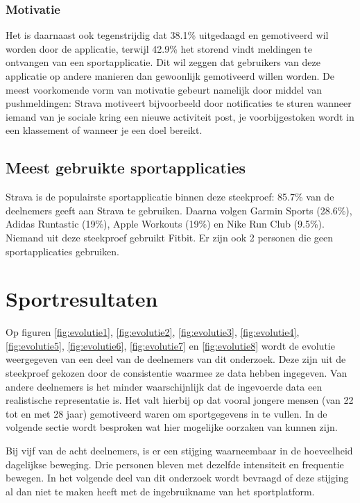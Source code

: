 \subsubsection{Motivatie}

Het is daarnaast ook tegenstrijdig dat 38.1\% uitgedaagd en gemotiveerd wil worden door de applicatie, terwijl 42.9\% het storend vindt meldingen te ontvangen van een sportapplicatie. Dit wil zeggen dat gebruikers van deze applicatie op andere manieren dan gewoonlijk gemotiveerd willen worden.
De meest voorkomende vorm van motivatie gebeurt namelijk door middel van pushmeldingen:
Strava motiveert bijvoorbeeld door notificaties te sturen wanneer iemand van je sociale kring een nieuwe activiteit post, je voorbijgestoken wordt in een klassement of wanneer je een doel bereikt.

\subsection{Meest gebruikte sportapplicaties}

Strava is de populairste sportapplicatie binnen deze steekproef: 85.7\% van de deelnemers geeft aan Strava te gebruiken. Daarna volgen Garmin Sports (28.6\%), Adidas Runtastic (19\%), Apple Workouts (19\%) en Nike Run Club (9.5\%). Niemand uit deze steekproef gebruikt Fitbit. Er zijn ook 2 personen die geen sportapplicaties gebruiken.

\section{Sportresultaten}

Op figuren \ref{fig:evolutie1}, \ref{fig:evolutie2}, \ref{fig:evolutie3}, \ref{fig:evolutie4}, \ref{fig:evolutie5}, \ref{fig:evolutie6}, \ref{fig:evolutie7} en \ref{fig:evolutie8} wordt de evolutie weergegeven van een deel van de deelnemers van dit onderzoek. Deze zijn uit de steekproef gekozen door de consistentie waarmee ze data hebben ingegeven. Van andere deelnemers is het minder waarschijnlijk dat de ingevoerde data een realistische representatie is. Het valt hierbij op dat vooral jongere mensen (van 22 tot en met 28 jaar) gemotiveerd waren om sportgegevens in te vullen. In de volgende sectie wordt besproken wat hier mogelijke oorzaken van kunnen zijn.

Bij vijf van de acht deelnemers, is er een stijging waarneembaar in de hoeveelheid dagelijkse beweging. Drie personen bleven met dezelfde intensiteit en frequentie bewegen. In het volgende deel van dit onderzoek wordt bevraagd of deze stijging al dan niet te maken heeft met de ingebruikname van het sportplatform.

